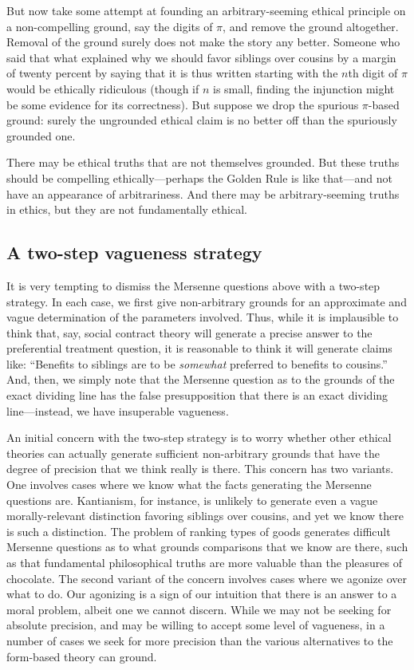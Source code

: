 But now take some attempt at founding an arbitrary-seeming ethical principle on a non-compelling ground, say the digits of $\pi$, and remove the ground altogether. Removal
of the ground surely does not make the story any better. Someone who said that what explained why we should favor siblings over cousins by a margin of
twenty percent by saying that it is thus written starting with the $n$th digit of $\pi$ would be ethically ridiculous (though if $n$ is small, finding
the injunction might be some evidence for its correctness). But suppose we drop the spurious $\pi$-based ground: surely the ungrounded ethical claim is
no better off than the spuriously grounded one. 

There may be ethical truths that are not themselves grounded. But these truths should be compelling ethically---perhaps the Golden Rule is like that---and not 
have an appearance of arbitrariness. And there may be arbitrary-seeming truths in ethics, but they are not fundamentally ethical.

\subsection{A two-step vagueness strategy}
It is very tempting to dismiss the Mersenne questions above with a two-step strategy. In each case, we first give non-arbitrary grounds for 
an approximate and vague determination of the parameters involved. Thus, while it is implausible to think that, say, social contract theory
will generate a precise answer to the preferential treatment question, it is reasonable to think it will generate claims like: ``Benefits to 
siblings are to be \textit{somewhat} preferred to benefits to cousins.'' And, then, we simply note that the Mersenne question as to the grounds
of the exact dividing line has the false presupposition that there is an exact dividing line---instead, we have insuperable vagueness.

An initial concern with the two-step strategy is to worry whether other ethical theories can actually generate sufficient non-arbitrary grounds
that have the degree of precision that we think really is there. 
This concern has two variants. One involves cases where we know what the facts generating the Mersenne questions are.
Kantianism, for instance, is unlikely to generate even a vague morally-relevant 
distinction favoring siblings over cousins, and yet we know there is such a distinction. The problem of ranking types of goods generates difficult 
Mersenne questions as to what grounds comparisons that we know are there, such as that fundamental philosophical truths are more valuable than the 
pleasures of chocolate. The second variant of the concern involves cases where we agonize over what to do. Our agonizing is a sign of our intuition
that there is an answer to a moral problem, albeit one we cannot discern. While we may not be seeking for absolute precision, and may be willing
to accept some level of vagueness, in a number of cases we seek for more precision than the various alternatives to the form-based theory can ground. 

